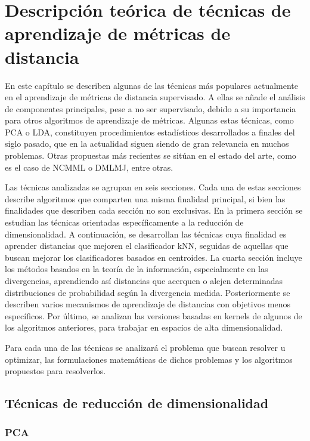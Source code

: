 \chapter{Descripción teórica de técnicas de aprendizaje de métricas de distancia} \label{chapter:dml_algorithms}

En este capítulo se describen algunas de las técnicas más populares actualmente en el aprendizaje de métricas de distancia supervisado. A ellas se añade el análisis de componentes principales, pese a no ser supervisado, debido a su importancia para otros algoritmos de aprendizaje de métricas. Algunas estas técnicas, como PCA o LDA, constituyen procedimientos estadísticos desarrollados a finales del siglo pasado, que en la actualidad siguen siendo de gran relevancia en muchos problemas. Otras propuestas más recientes se sitúan en el estado del arte, como es el caso de NCMML o DMLMJ, entre otras.

Las técnicas analizadas se agrupan en seis secciones. Cada una de estas secciones describe algoritmos que comparten una misma finalidad principal, si bien las finalidades que describen cada sección no son exclusivas. En la primera sección se estudian las técnicas orientadas específicamente a la reducción de dimensionalidad. A continuación, se desarrollan las técnicas cuya finalidad es aprender distancias que mejoren el clasificador kNN, seguidas de aquellas que buscan mejorar los clasificadores basados en centroides. La cuarta sección incluye los métodos basados en la teoría de la información, especialmente en las divergencias, aprendiendo así distancias que acerquen o alejen determinadas distribuciones de probabilidad según la divergencia medida. Posteriormente se describen varios mecanismos de aprendizaje de distancias con objetivos menos específicos. Por último, se analizan las versiones basadas en kernels de algunos de los algoritmos anteriores, para trabajar en espacios de alta dimensionalidad.

Para cada una de las técnicas se analizará el problema que buscan resolver u optimizar, las formulaciones matemáticas de dichos problemas y los algoritmos propuestos para resolverlos.

\section{Técnicas de reducción de dimensionalidad}

\subsection{PCA}

